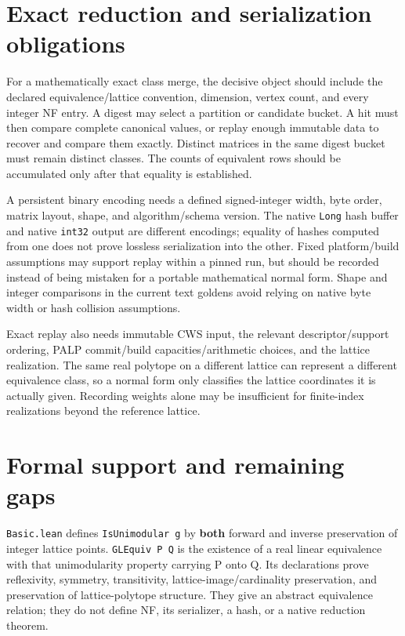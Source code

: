 \documentclass[11pt,a4paper,oneside]{report}
\begin{document}
\section{Exact reduction and serialization
obligations}\label{normal-forms-and-classification--exact-reduction-and-serialization-obligations}

For a mathematically exact class merge, the decisive object should
include the declared equivalence/lattice convention, dimension, vertex
count, and every integer NF entry. A digest may select a partition or
candidate bucket. A hit must then compare complete canonical values, or
replay enough immutable data to recover and compare them exactly.
Distinct matrices in the same digest bucket must remain distinct
classes. The counts of equivalent rows should be accumulated only after
that equality is established.

A persistent binary encoding needs a defined signed-integer width, byte
order, matrix layout, shape, and algorithm/schema version. The native
\texttt{Long} hash buffer and native \texttt{int32} output are different
encodings; equality of hashes computed from one does not prove lossless
serialization into the other. Fixed platform/build assumptions may
support replay within a pinned run, but should be recorded instead of
being mistaken for a portable mathematical normal form. Shape and
integer comparisons in the current text goldens avoid relying on native
byte width or hash collision assumptions.

Exact replay also needs immutable CWS input, the relevant
descriptor/support ordering, PALP commit/build capacities/arithmetic
choices, and the lattice realization. The same real polytope on a
different lattice can represent a different equivalence class, so a
normal form only classifies the lattice coordinates it is actually
given. Recording weights alone may be insufficient for finite-index
realizations beyond the reference lattice.

\section{Formal support and remaining
gaps}\label{normal-forms-and-classification--formal-support-and-remaining-gaps}

\texttt{Basic.\allowbreak{}lean} defines
\texttt{IsUnimod\allowbreak{}ular g} by \textbf{both} forward and
inverse preservation of integer lattice points. \texttt{GLEquiv P Q} is
the existence of a real linear equivalence with that unimodularity
property carrying P onto Q. Its declarations prove reflexivity,
symmetry, transitivity, lattice-image/cardinality preservation, and
preservation of lattice-polytope structure. They give an abstract
equivalence relation; they do not define NF, its serializer, a hash, or
a native reduction theorem.
\end{document}
